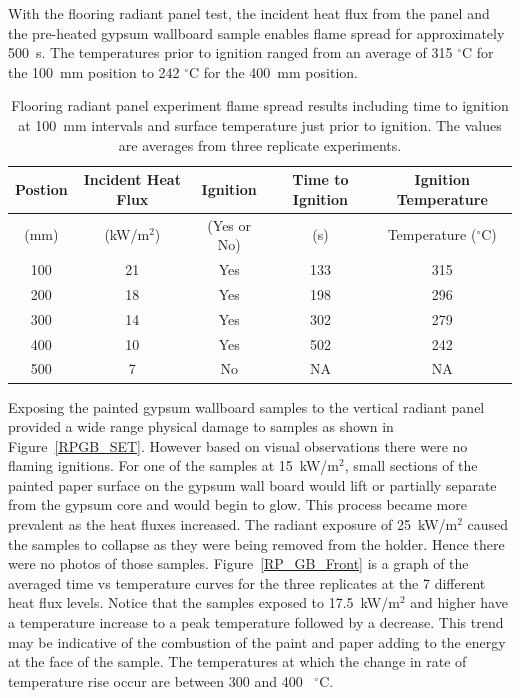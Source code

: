 \documentclass[twoside]{uocthesis}
\begin{document}
 With the flooring radiant panel test, the incident heat flux from the panel and the pre-heated gypsum wallboard sample enables flame spread for approximately 500~s.  The temperatures prior to ignition ranged from an average of 315 $^{\circ}$C for the 100~mm position to 242 $^{\circ}$C for the 400~mm position.      
 
      
\begin{table}
	\centering
	\small
	\begin{tabular}{|c|c|c|c|c|}
		\hline Postion & Incident Heat Flux & Ignition & Time to Ignition & Ignition Temperature \\
		\hline (mm) & (kW/m$^2$) & (Yes or No) & (s)  & Temperature ($^{\circ}$C)   \\ \hline
		\hline 100 	& 21	& Yes 	& 133	& 315 	 \\
		\hline 200	& 18 	& Yes 	& 198 	& 296 	 \\
		\hline 300	& 14	& Yes 	& 302 	& 279 	 \\
		\hline 400	& 10	& Yes 	& 502 	& 242 	 \\
		\hline 500	&  7	& No 	& NA 	& NA   	 \\
		\hline
	\end{tabular}
	\caption[Flooring radiant panel experiment flame spread results]{Flooring radiant panel experiment flame spread results including time to ignition at 100~mm intervals and surface temperature just prior to ignition.  The values are averages from three replicate experiments.}
	\label{tab:FRP_timetemp}
\end{table}


Exposing the painted gypsum wallboard samples to the vertical radiant panel provided a wide range physical damage to samples as shown in Figure~\ref{RPGB_SET}.  However based on visual observations there were no flaming ignitions.  For one of the samples at 15~kW/m$^2$, small sections of the painted paper surface on the gypsum wall board would lift or partially separate from the gypsum core and would begin to glow.  This process became more prevalent as the heat fluxes increased.  The radiant exposure of 25~kW/m$^2$ caused the samples to collapse as they were being removed from the holder.  Hence there were no photos of those samples.   Figure~\ref{RP_GB_Front} is a graph of the averaged time vs temperature curves for the three replicates at the 7 different heat flux levels.  Notice that the samples exposed to 17.5~kW/m$^2$ and higher have a temperature increase to a peak temperature followed by a decrease.  This trend may be indicative of the combustion of the paint and paper adding to the energy at the face of the sample. The temperatures at which the change in rate of temperature rise occur are between 300 and 400~ $^{\circ}$C.       
  
\end{document}
